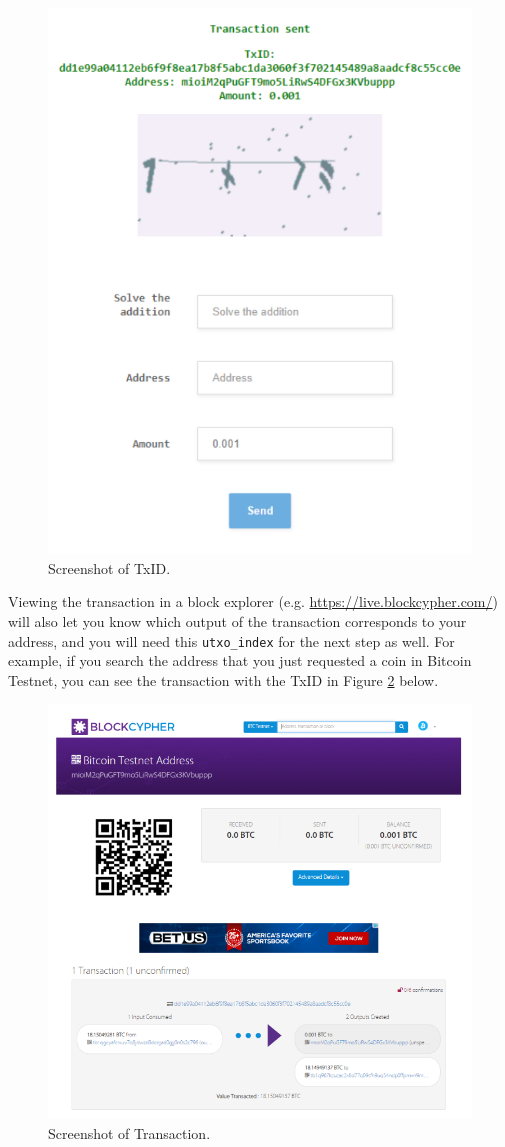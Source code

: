 \documentclass[11pt]{article}
\begin{document}
\begin{enumerate}
\begin{enumerate}
\begin{figure}[h!]
  \centering
  \includegraphics[width=.75\textwidth]{txid.png}
  \caption{Screenshot of TxID.}
\label{figure:txid}
\end{figure}


Viewing the transaction in a block explorer (e.g.
        \href{https://live.blockcypher.com/}{https://live.blockcypher.com/}) will also let you know which output of the transaction corresponds to your address, and you will need this \texttt{utxo\_index} for the next step as well.  For example, if you search the address that you just requested a coin in Bitcoin Testnet, you can see the transaction with the TxID in Figure \ref{figure:transcation} below. 

\begin{figure}[h!]

  \centering
  \includegraphics[width=.75\textwidth]{transcation.png}
  \caption{Screenshot of Transaction.}
\label{figure:transcation}
\end{figure}


\end{enumerate}
\end{enumerate}
\end{document}

